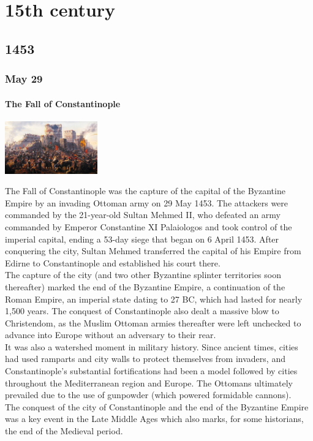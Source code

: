 \documentclass[11pt]{report}
\begin{document}
					
\part{15th century}
\chapter{1453}
\section{May 29}
\subsection{The Fall of Constantinople}
\vspace{2mm}\begin{center}\includegraphics[width=4cm]{./img/fallofConstantpl.jpg}\end{center}
The Fall of Constantinople was the capture of the capital of the Byzantine Empire by an invading Ottoman army on 29 May 1453. The attackers were commanded by the 21-year-old Sultan Mehmed II, who defeated an army commanded by Emperor Constantine XI Palaiologos and took control of the imperial capital, ending a 53-day siege that began on 6 April 1453. After conquering the city, Sultan Mehmed transferred the capital of his Empire from Edirne to Constantinople and established his court there.\\
The capture of the city (and two other Byzantine splinter territories soon thereafter) marked the end of the Byzantine Empire, a continuation of the Roman Empire, an imperial state dating to 27 BC, which had lasted for nearly 1,500 years. The conquest of Constantinople also dealt a massive blow to Christendom, as the Muslim Ottoman armies thereafter were left unchecked to advance into Europe without an adversary to their rear.\\
It was also a watershed moment in military history. Since ancient times, cities had used ramparts and city walls to protect themselves from invaders, and Constantinople's substantial fortifications had been a model followed by cities throughout the Mediterranean region and Europe. The Ottomans ultimately prevailed due to the use of gunpowder (which powered formidable cannons).\\
The conquest of the city of Constantinople and the end of the Byzantine Empire was a key event in the Late Middle Ages which also marks, for some historians, the end of the Medieval period.
\end{document}
